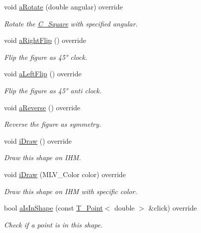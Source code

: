 \begin{DoxyCompactItemize}
void \hyperlink{classC__Square_af74175a5e8d61216d68fde18ef9c9481}{a\+Rotate} (double angular) override
\begin{DoxyCompactList}\small\item\em Rotate the \hyperlink{classC__Square}{C\+\_\+\+Square} with specified angular. \end{DoxyCompactList}\item 
void \hyperlink{classC__Square_a0ea2df0d283ee4ffa911163e55a0a637}{a\+Right\+Flip} () override
\begin{DoxyCompactList}\small\item\em Flip the figure as 45° clock. \end{DoxyCompactList}\item 
void \hyperlink{classC__Square_a31d31862502f0ed24e8331af30100338}{a\+Left\+Flip} () override
\begin{DoxyCompactList}\small\item\em Flip the figure as 45° anti clock. \end{DoxyCompactList}\item 
void \hyperlink{classC__Square_a961d1f5c49a45459668744d459863bd2}{a\+Reverse} () override
\begin{DoxyCompactList}\small\item\em Reverse the figure as symmetry. \end{DoxyCompactList}\item 
void \hyperlink{classC__Square_ae6c51a7720576bcbb94b52584552df28}{i\+Draw} () override
\begin{DoxyCompactList}\small\item\em Draw this shape on I\+HM. \end{DoxyCompactList}\item 
void \hyperlink{classC__Square_a47a80c25bbeda17f17a8230127b4a5ed}{i\+Draw} (M\+L\+V\+\_\+\+Color color) override
\begin{DoxyCompactList}\small\item\em Draw this shape on I\+HM with specific color. \end{DoxyCompactList}\item 
bool \hyperlink{classC__Square_ac5ffad4afca051f117b43012fb4dc239}{a\+Is\+In\+Shape} (const \hyperlink{classT__Point}{T\+\_\+\+Point}$<$ double $>$ \&click) override
\begin{DoxyCompactList}\small\item\em Check if a point is in this shape. \end{DoxyCompactList}\item 

\end{DoxyCompactItemize}
